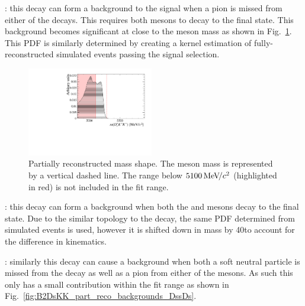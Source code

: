 \begin{description}
\item \decay{\Bsb}{\Dsp\Dsm}: this decay can form a background to the signal when a pion is missed from either of the \Dsp decays. This requires both \Dsp mesons to decay to the \decay{\Dsp}{\Kp\Km\pip} final state. 
This background becomes significant at close to the \Bp meson mass as shown in Fig.~\ref{fig:B2DsKK_part_reco_backgrounds_DsDs}. 
This PDF is similarly determined by creating a kernel estimation of fully-reconstructed simulated events passing the signal selection.  
\end{description}

\begin{figure}[!h]
    \centering
    \includegraphics[width=0.49\textwidth]{figs/B2DsKK/Bs2DsDs_4800_5900_Shape.pdf}
    \caption{Partially reconstructed \decay{\Bsb}{\Dsp\Dsm} mass shape. The \Bp meson mass is represented by a vertical dashed line. The range below $5100{\mathrm{\,Me\kern -0.1em V\!/}c^2}$ (highlighted in red) is not included in the fit range.}
    \label{fig:B2DsKK_part_reco_backgrounds_DsDs}   
\end{figure}

\begin{description}
\item \decay{\Bzb}{\Dsp\Dm}: this decay can form a background when both the \Dsp and \Dm mesons decay to the \Kpm\Kmp\pipm final state. Due to the similar topology to the \decay{\Bsb}{\Dsp\Dsm} decay, the same PDF determined from simulated events is used, however it is shifted down in mass by 40\mevcc to account for the difference in kinematics.

\item \decay{\Bsb}{\Dssp\Dsm}: similarly this decay can cause a background when both a soft neutral particle is missed from the  decay as well as a pion from either of the \Dsp mesons. As such this only has a small contribution within the fit range as shown in Fig.~\ref{fig:B2DsKK_part_reco_backgrounds_DssDs}. 
\end{description}

